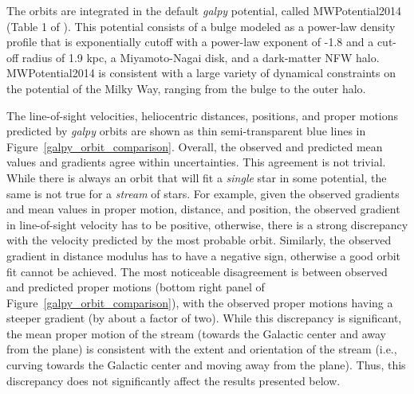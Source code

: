 \documentclass[iop]{emulateapj}
\begin{document}
The orbits are integrated in the default {\em galpy} potential, called
MWPotential2014 (Table 1 of \citealt{bov15}). This potential
consists of a bulge modeled as a power-law density profile that is exponentially
cutoff with a power-law exponent of -1.8 and a cut-off radius of 1.9 kpc, a
Miyamoto-Nagai disk, and a dark-matter NFW halo. MWPotential2014 is consistent
with a large variety of dynamical constraints on the potential of the Milky Way,
ranging from the bulge to the outer halo.

\begin{figure*}
\caption{
This plot compares line-of-sight velocities ({\em top left}), distances
({\em top right}), positions ({\em bottom left}), and proper motions
({\em bottom right}) calculated by {\em galpy} (thin blue lines) with models
derived from observations (thin red lines). The observed and calculated values
are consistent within uncertainties, with proper motions being the only
exception.
\label{galpy_orbit_comparison}}
\end{figure*}

The line-of-sight velocities, heliocentric distances, positions, and proper
motions predicted by {\em galpy} orbits are shown as thin semi-transparent blue
lines in Figure~\ref{galpy_orbit_comparison}. Overall, the observed and
predicted mean values and gradients agree within uncertainties. This agreement
is not trivial. While there is always an orbit that will fit a {\em single} star
in some potential, the same is not true for a {\em stream} of stars. For
example, given the observed gradients and mean values in proper motion,
distance, and position, the observed gradient in line-of-sight velocity has to
be positive, otherwise, there is a strong discrepancy with the velocity
predicted by the most probable orbit. Similarly, the observed gradient in
distance modulus has to have a negative sign, otherwise a good orbit fit cannot 
be achieved. The most noticeable disagreement is between observed and predicted
proper motions (bottom right panel of Figure~\ref{galpy_orbit_comparison}), with
the observed proper motions having a steeper gradient (by about a factor of
two). While this discrepancy is significant, the mean proper motion of the
stream (towards the Galactic center and away from the plane) is consistent with
the extent and orientation of the stream (i.e., curving towards the Galactic
center and moving away from the plane). Thus, this discrepancy does not
significantly affect the results presented below.
\end{document}
